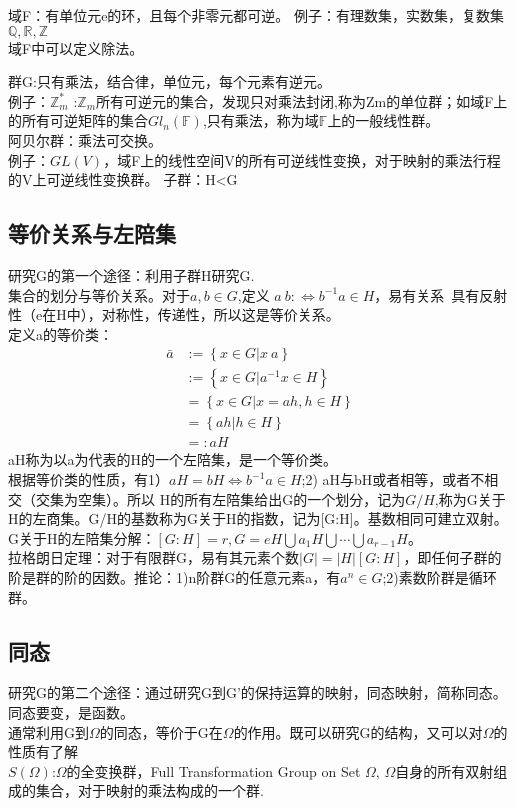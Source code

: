 \documentclass[UTF8]{article}
\begin{document}
域F：有单位元e的环，且每个非零元都可逆。
例子：有理数集，实数集，复数集$\mathbb {Q,R,Z}$\\
域F中可以定义除法。

群G:只有乘法，结合律，单位元，每个元素有逆元。\\
例子：$\mathbb Z_m^*$ :$\mathbb Z_m$所有可逆元的集合，发现只对乘法封闭,称为Zm的单位群；如域F上的所有可逆矩阵的集合$Gl_n(\mathbb F)$,只有乘法，称为域$\mathbb F$上的一般线性群。\\
阿贝尔群：乘法可交换。\\
例子：$GL(V)$，域F上的线性空间V的所有可逆线性变换，对于映射的乘法行程的V上可逆线性变换群。
子群：H<G\\

\subsection{等价关系与左陪集}
研究G的第一个途径：利用子群H研究G.\\
集合的划分与等价关系。对于$a,b \in G$,定义 $a~b:\Leftrightarrow b^{-1}a \in H$，易有关系~具有反射性（e在H中），对称性，传递性，所以这是等价关系。\\
定义a的等价类：
\begin{equation}
\begin{split}
\bar a  & :=\left\{ x \in G |x~a \right\}\\
        &:=\left\{ x \in G | a^{-1}x \in H \right\}\\
        &= \left\{ x\in G | x=ah,h\in H \right\}\\
        & =\left\{ ah |h \in H \right\}\\
        &=:aH
\end{split}
\end{equation}
aH称为以a为代表的H的一个左陪集，是一个等价类。\\
根据等价类的性质，有1）$aH=bH \Leftrightarrow b^{-1}a \in H$;2) aH与bH或者相等，或者不相交（交集为空集）。所以 H的所有左陪集给出G的一个划分，记为$G/H$,称为G关于H的左商集。G/H的基数称为G关于H的指数，记为[G:H]。基数相同可建立双射。\\
G关于H的左陪集分解：$[G:H]=r, G=eH \bigcup a_1H \bigcup \cdots \bigcup a_{r-1}H$。\\
拉格朗日定理：对于有限群G，易有其元素个数$|G|=|H|[G:H]$，即任何子群的阶是群的阶的因数。推论：1)n阶群G的任意元素a，有$a^n \in G$;2)素数阶群是循环群。

\subsection{同态}
研究G的第二个途径：通过研究G到G'的保持运算的映射，同态映射，简称同态。同态要变，是函数。\\
通常利用G到$\Omega$的同态，等价于G在$\Omega$的作用。既可以研究G的结构，又可以对$\Omega$的性质有了解\\
$S(\Omega)$:$\Omega$的全变换群，Full Transformation Group on Set $\Omega$, $\Omega$自身的所有双射组成的集合，对于映射的乘法构成的一个群.\\
\end{document}
